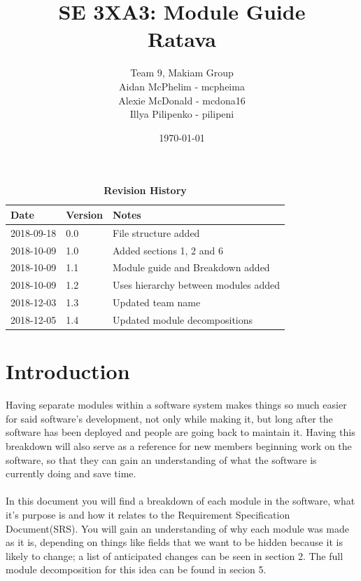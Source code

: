 \documentclass[12pt, titlepage]{article}
\title{SE 3XA3: Module Guide\\Ratava}
\author{Team 9, Makiam Group
        \\ Aidan McPhelim - mcpheima
		\\ Alexie McDonald - mcdona16
		\\ Illya Pilipenko - pilipeni}
\date{\today}
\begin{document}
\maketitle

\tableofcontents
\listoftables
\listoffigures

\begin{table}[bp]
\caption{\bf Revision History}
\begin{tabularx}{\textwidth}{p{4cm}p{2cm}X}
\toprule {\bf Date} & {\bf Version} & {\bf Notes}\\
\midrule
2018-09-18 & 0.0 & File structure added \\
2018-10-09 & 1.0 & Added sections 1, 2 and 6 \\
2018-10-09 & 1.1 & Module guide and Breakdown added\\
2018-10-09 & 1.2 & Uses hierarchy between modules added\\
2018-12-03 & 1.3 & Updated team name\\
2018-12-05 & 1.4 & Updated module decompositions\\
\bottomrule
\end{tabularx}
\end{table}

\newpage


\section{Introduction}

Having separate modules within a software system makes things so much easier for said software's development, not only while making it, but long after the software has been deployed and people are going back to maintain it. Having this breakdown will also serve as a reference for new members beginning work on the software, so that they can gain an understanding of what the software is currently doing and save time.
\\\\
In this document you will find a breakdown of each module in the software, what it's purpose is and how it relates to the Requirement Specification Document(SRS). You will gain an understanding of why each module was made as it is, depending on things like fields that we want to be hidden because it is likely to change; a list of anticipated changes can be seen in section 2. The full module decomposition for this idea can be found in secion 5.
\end{document}
